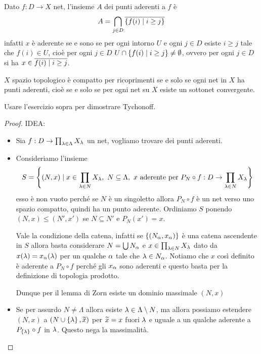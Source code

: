 \begin{remark}
Dato $f:D\to X$ net, l'insieme $A$ dei punti aderenti a $f$ \`e
\[A=\bigcap_{j\in D} \overline{\left\{{f(i)\mid i\geq j}\right\}}\]
infatti $x$ \`e aderente se e sono se per ogni intorno $U$ e ogni $j\in D$ esiste $i\geq j$ tale che $f(i)\in U$, cio\`e per ogni $j\in D$ $U\cap\left\{{f(i)\mid i\geq j}\right\}\neq \emptyset$, ovvero per ogni $j\in D$ si ha $x\in \overline{f(i)\mid i\geq j}$.
\end{remark}

\begin{exercise}
$X$ spazio topologico \`e compatto per ricoprimenti se e solo se ogni net in $X$ ha punti aderenti, cio\`e se e solo se per ogni net su $X$ esiste un sottonet convergente.
\end{exercise}

\begin{exercise}
Usare l'esercizio sopra per dimostrare Tychonoff.
\end{exercise}
\begin{proof}
IDEA:
\begin{itemize}
	\item Sia $f:D\to \prod_{\lambda\in \Lambda}X_\lambda$ un net, vogliamo trovare dei punti aderenti.
	\item Consideriamo l'insieme
	\[S=\cpa{(N,x)\mid x\in \prod_{\la\in N}X_\la,\ N\subseteq \Lambda,\ x\text{ aderente per }P_N\circ f:D\to \prod_{\la\in N}X_\la}\]
	esso \`e non vuoto perch\'e se $N$ \`e un singoletto allora $P_N\circ f$ \`e un net verso uno spazio compatto, quindi ha un punto aderente. Ordiniamo $S$ ponendo $(N,x)\leq (N',x')$ se $N\subseteq N'$ e $P_N(x')=x$.

	Vale la condizione della catena, infatti se $\left\{{(N_\alpha,x_\alpha)}\right\}$ \`e una catena ascendente in $S$ allora basta considerare $N=\bigcup N_\alpha$ e $x\in \prod_{\lambda\in N} X_\lambda$ dato da $x(\lambda)=x_\alpha(\lambda)$ per un qualche $\alpha$ tale che $\lambda\in N_\alpha$. Notiamo che $x$ cos\`i definito \`e aderente a $P_N\circ f$ perch\'e gli $x_\alpha$ sono aderenti e questo basta per la definizione di topologia prodotto.

	Dunque per il lemma di Zorn esiste un dominio massimale $(N,x)$
	\item Se per assurdo $N\neq \Lambda$ allora esiste $\lambda\in \Lambda\setminus N$, ma allora possiamo estendere $(N,x)$ a $(N\cup \left\{{\lambda}\right\},\widetilde{x})$ per $\widetilde{x}=x$ fuori $\lambda$ e uguale a un qualche aderente a $P_{\left\{{\lambda}\right\}}\circ f$ in $\lambda$. Questo nega la massimalit\`a.
\end{itemize}
\end{proof}

